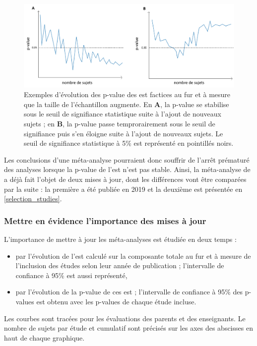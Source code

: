 \begin{figure}[h!]
  \centering
	\includegraphics[width=1\linewidth]{figures/chapter-2/meta-analysis-evolution-p-value-examples} 
  \caption{Exemples d'évolution des p-value des \gls{est} factices au fur et à mesure que la taille de l'échantillon augmente. 
	En \textbf{A}, la p-value se stabilise sous le seuil de signifiance statistique suite à l'ajout de nouveaux sujets ; en \textbf{B}, la p-value 
	passe temprorairement sous le seuil de signifiance puis s'en éloigne suite à l'ajout de nouveaux sujets. 
	Le seuil de signifiance statistique à 5\% est représenté en pointillés noirs.}
  \label{Figure:meta-analysis-evolution-p-value-examples}
\end{figure}

Les conclusions d'une méta-analyse pourraient donc souffrir de l'arrêt prématuré des analyses lorsque la p-value de l'\gls{est} n'est pas stable. 
Ainsi, la méta-analyse de \citet{Cortese2016} a déjà fait l'objet de deux mises à jour, dont les différences vont être comparées par la suite : la première a été publiée 
en 2019 \citep{Bussalb2019clinical} et la deuxième est présentée en \ref{selection_studies}. 

\subsubsection{Mettre en évidence l'importance des mises à jour}

L'importance de mettre à jour les méta-analyses est étudiée en deux temps :
\begin{itemize}
\item par l'évolution de l'\gls{est} calculé sur la composante totale au fur et à mesure de l'inclusion des études selon leur année de publication ; l'intervalle de confiance à 95\% est 
aussi représenté,
\item par l'évolution de la p-value de ces \gls{est} ; l'intervalle de confiance à 95\% des p-values
est obtenu avec les p-values de chaque étude incluse.
\end{itemize}
Les courbes sont tracées pour les évaluations des parents et des enseignants. Le nombre de sujets par étude et cumulatif sont précisés sur les axes 
des abscisses en haut de chaque graphique.
 
